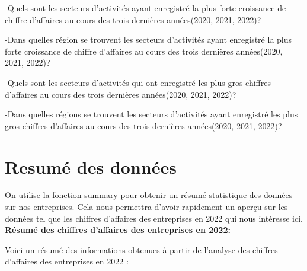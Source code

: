 \documentclass[mstat,12pt]{unswthesis}
\newenvironment{Shaded}{\begin{snugshade}}{\end{snugshade}}
\newcommand{\FunctionTok}[1]{\textcolor[rgb]{0.00,0.00,0.00}{#1}}
\newcommand{\NormalTok}[1]{#1}
\newcommand{\SpecialCharTok}[1]{\textcolor[rgb]{0.00,0.00,0.00}{#1}}
\begin{document}
-Quels sont les secteurs d'activités ayant enregistré la plus forte
croissance de chiffre d'affaires au cours des trois dernières
années(2020, 2021, 2022)?

-Dans quelles région se trouvent les secteurs d'activités ayant
enregistré la plus forte croissance de chiffre d'affaires au cours des
trois dernières années(2020, 2021, 2022)?

-Quels sont les secteurs d'activités qui ont enregistré les plus gros
chiffres d'affaires au cours des trois dernières années(2020, 2021,
2022)?

-Dans quelles régions se trouvent les secteurs d'activités ayant
enregistré les plus gros chiffres d'affaires au cours des trois
dernières années(2020, 2021, 2022)?

\hypertarget{resumuxe9-des-donnuxe9es}{%
\section{\texorpdfstring{\textbf{Resumé des
données}}{Resumé des données}}\label{resumuxe9-des-donnuxe9es}}

On utilise la fonction summary pour obtenir un résumé statistique des
données sur nos entreprises. Cela nous permettra d'avoir rapidement un
aperçu sur les données tel que les chiffres d'affaires des entreprises
en 2022 qui nous intéresse ici. \bigskip \textbf{Résumé des chiffres
d'affaires des entreprises en 2022:}

\begin{Shaded}
\end{Shaded}

\medskip

Voici un résumé des informations obtenues à partir de l'analyse des
chiffres d'affaires des entreprises en 2022 :
\end{document}
